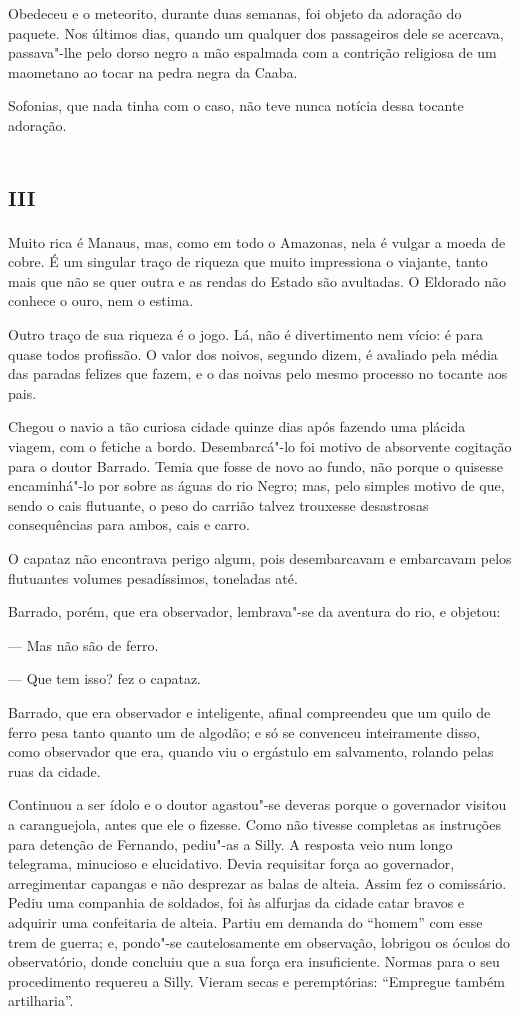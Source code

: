 Obedeceu e o meteorito, durante duas semanas, foi objeto da adoração do
paquete. Nos últimos dias, quando um qualquer dos passageiros dele se
acercava, passava"-lhe pelo dorso negro a mão espalmada com a contrição
religiosa de um maometano ao tocar na pedra negra da Caaba.

Sofonias, que nada tinha com o caso, não teve nunca notícia dessa
tocante adoração.

\section*{\textsc{iii}}

Muito rica é Manaus, mas, como em todo o Amazonas, nela é vulgar a moeda
de cobre. É um singular traço de riqueza que muito impressiona o
viajante, tanto mais que não se quer outra e as rendas do Estado são
avultadas. O Eldorado não conhece o ouro, nem o estima.

Outro traço de sua riqueza é o jogo. Lá, não é divertimento nem vício: é
para quase todos profissão. O valor dos noivos, segundo dizem, é
avaliado pela média das paradas felizes que fazem, e o das noivas pelo
mesmo processo no tocante aos pais.

Chegou o navio a tão curiosa cidade quinze dias após fazendo uma plácida
viagem, com o fetiche a bordo. Desembarcá"-lo foi motivo de absorvente
cogitação para o doutor Barrado. Temia que fosse de novo ao fundo, não
porque o quisesse encaminhá"-lo por sobre as águas do rio Negro; mas,
pelo simples motivo de que, sendo o cais flutuante, o peso do carrião
talvez trouxesse desastrosas consequências para ambos, cais e carro.

O capataz não encontrava perigo algum, pois desembarcavam e embarcavam
pelos flutuantes volumes pesadíssimos, toneladas até.

Barrado, porém, que era observador, lembrava"-se da aventura do rio, e
objetou:

--- Mas não são de ferro.

--- Que tem isso? fez o capataz.

Barrado, que era observador e inteligente, afinal compreendeu que um
quilo de ferro pesa tanto quanto um de algodão; e só se convenceu
inteiramente disso, como observador que era, quando viu o ergástulo em
salvamento, rolando pelas ruas da cidade.

Continuou a ser ídolo e o doutor agastou"-se deveras porque o governador
visitou a caranguejola, antes que ele o fizesse. Como não tivesse
completas as instruções para detenção de Fernando, pediu"-as a Silly. A
resposta veio num longo telegrama, minucioso e elucidativo. Devia
requisitar força ao governador, arregimentar capangas e não desprezar as
balas de alteia. Assim fez o comissário. Pediu uma companhia de
soldados, foi às alfurjas da cidade catar bravos e adquirir uma
confeitaria de alteia. Partiu em demanda do ``homem'' com esse trem de
guerra; e, pondo"-se cautelosamente em observação, lobrigou os óculos do
observatório, donde concluiu que a sua força era insuficiente. Normas
para o seu procedimento requereu a Silly. Vieram secas e peremptórias:
``Empregue também artilharia''.

